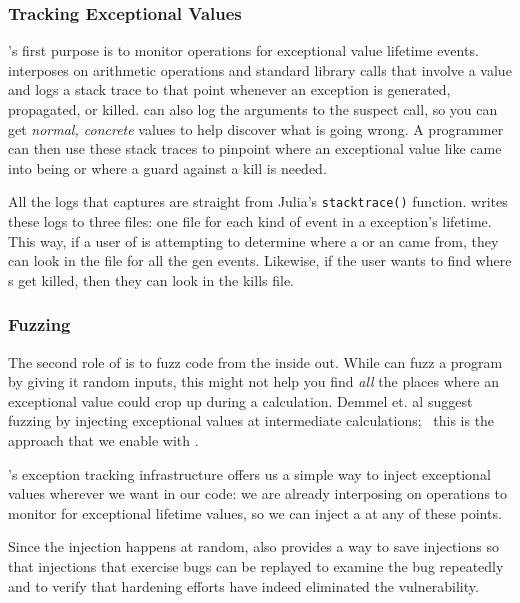 \documentclass{juliacon}
\begin{document}
\subsubsection{Tracking Exceptional Values}
\label{s:trackingexceptionalvalues}

\FT{}'s first purpose is to monitor \fp{} operations for exceptional value lifetime events.
\FT{} interposes on arithmetic operations and standard library calls that involve a \fp{} value and logs a stack trace to that point whenever an exception is generated, propagated, or killed.
\FT{} can also log the arguments to the suspect call, so you can get \emph{normal, concrete} values to help discover what is going wrong.
A programmer can then use these stack traces to pinpoint where an exceptional value like \NaN{} came into being or where a guard against a \NaN{} kill is needed.

All the logs that \FT{} captures are straight from Julia's \texttt{stacktrace()} function.
\FT{} writes these logs to three files: one file for each kind of event in a \fp{} exception's lifetime.
This way, if a user of \FT{} is attempting to determine where a \NaN{} or an \Inf{} came from, they can look in the file for all the gen events.
Likewise, if the user wants to find where \NaN{}s get killed, then they can look in the kills file.

\subsubsection{Fuzzing}

The second role of \FT{} is to fuzz code from the inside out.
While can fuzz a program by giving it random inputs, this might not help you find \emph{all} the places where an exceptional value could crop up during a calculation.
Demmel et. al suggest fuzzing by injecting exceptional values at intermediate calculations;~\cite{ddghlllprr-correctness-2022} this is the approach that we enable with \FT{}.

\FT{}'s exception tracking infrastructure offers us a simple way to inject exceptional values wherever we want in our code: we are already interposing on \fp{} operations to monitor for exceptional lifetime values, so we can inject a \NaN{} at any of these points.

Since the injection happens at random, \FT{} also provides a way to save \NaN{} injections so that injections that exercise bugs can be replayed to examine the bug repeatedly and to verify that hardening efforts have indeed eliminated the vulnerability.
\end{document}
